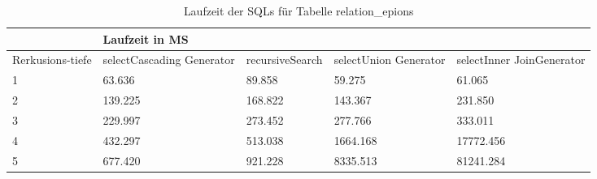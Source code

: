 \begin{table}[H]
	\begin{tabular}{l|l|l|l|l|l|}
		\cline{2-6}
		& \multicolumn{5}{|l|}{Laufzeit in MS}                                                                                                                                                  \\ \hline
		\multicolumn{1}{|l|}{\multirow{2}{2cm}{Rerkusions-tiefe}} & \multicolumn{2}{|l|}{\multirow{2}{3cm}{selectCascading Generator}} & \multirow{2}{2.8cm}{recursiveSearch} & \multirow{2}{2.5cm}{selectUnion Generator} & \multirow{2}{2.5cm}{selectInner JoinGenerator} \\
		\multicolumn{1}{|l|}{}
		& \multicolumn{2}{|l|}{}                                           &                                  &                                     &                                           \\ \hline
	\multicolumn{1}{|l|}{1}               & \multicolumn{2}{l|}{63.636}                                     & 89.858                           & 59.275                              & 61.065                                    \\ \hline
	\multicolumn{1}{|l|}{2}               & \multicolumn{2}{l|}{139.225}                                    & 168.822                          & 143.367                             & 231.850                                   \\ \hline
	\multicolumn{1}{|l|}{3}               & \multicolumn{2}{l|}{229.997}                                    & 273.452                          & 277.766                             & 333.011                                   \\ \hline
	\multicolumn{1}{|l|}{4}               & \multicolumn{2}{l|}{432.297}                                    & 513.038                          & 1664.168                            & 17772.456                                 \\ \hline
	\multicolumn{1}{|l|}{5}               & \multicolumn{2}{l|}{677.420}                                    & 921.228                          & 8335.513                            & 81241.284                                 \\ \hline
	
	\end{tabular}
	\caption{Laufzeit der SQLs für Tabelle relation\_epions}
\end{table}

